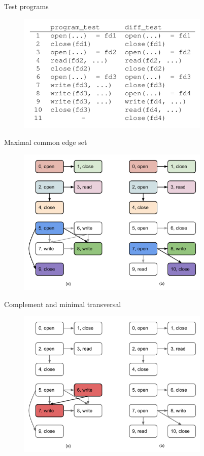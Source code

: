 \documentclass{beamer}
\begin{document}
\begin{frame}{Test programs}
  \begin{figure}[p]
    \includegraphics[width=3.6in]{img/programs.png}
    \end{figure}
\end{frame}

\begin{frame}{Maximal common edge set}
  \begin{figure}[p]
    \includegraphics[width=3.6in]{img/max-common-edge-set.pdf}
    \end{figure}
\end{frame}

\begin{frame}{Complement and minimal transversal}
  \begin{figure}[p]
    \includegraphics[width=3.6in]{img/min-transversal-compl.pdf}
    \end{figure}
\end{frame}
\end{document}
